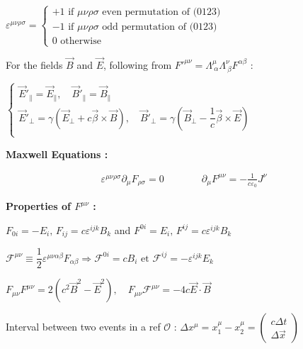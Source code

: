 \item $\varepsilon^{\mu\nu\rho\sigma} = 
\begin{cases}
+1 \, \, \text{if $\mu\nu\rho\sigma$ even permutation of (0123)}  \\
-1 \, \, \text{if $\mu\nu\rho\sigma$ odd permutation of (0123)} \\
0 \, \, \text{otherwise}	
\end{cases}$
\item For the fields $\vec{B}$ and $\vec{E}$, following from $F'^{\mu\nu}=\Lambda^\mu_{\ \alpha}\Lambda^\nu_{\ \beta} F^{\alpha\beta}$ : 
\item $\begin{cases}
\vec{E}'_{\parallel} = \vec{E}_{\parallel}, \quad \vec{B}'_{\parallel} = \vec{B}_{\parallel} \\
\vec{E}'_{\perp} = \gamma(\vec{E}_{\perp} + c \vec{\beta}\times \vec{B}), \quad \vec{B}'_{\perp} = \gamma(\vec{B}_{\perp} - \dfrac{1}{c}\vec{\beta} \times \vec{E} )\\
\end{cases}$
\item[] \textbf{Maxwell Equations :}

$$\boxed{\begin{split}
	\varepsilon^{\mu \nu \rho \sigma}\partial_\mu F_{\rho \sigma}=0  \qquad \quad & \partial_\mu F^{\mu\nu}=-\frac{1}{c\varepsilon_0}J^\nu 
	\end{split}}$$

\item \textbf{Properties of $F^{\mu\nu} $ :} 

\item $F_{0i} = -E_i, \,  F_{ij} =  c \varepsilon^{ijk}B_k$ and $F^{0i} = E_i, \, F^{ij} = c\varepsilon^{ijk}B_k$

\item $\mathcal{F}^{\mu\nu} \equiv \dfrac{1}{2} \varepsilon^{\mu\nu\alpha\beta}F_{\alpha\beta} \Rightarrow \mathcal{F}^{0i} = cB_i \,\, \text{et} \,\, \mathcal{F}^{ij} = -\varepsilon^{ijk}E_k$

\item $F_{\mu\nu}F^{\mu\nu} = 2(c^2\vec{B}^2 - \vec{E}^2), \quad F_{\mu\nu}\mathcal{F}^{\mu\nu} = -4c\vec{E}\cdot\vec{B}$

\squishend
{}
\squishlist
\item Interval between two events in a ref $\mathcal{O}$ : $ \Delta x^{\mu} = x_1^{\mu} - x_2^{\mu} = \begin{pmatrix}
    c\Delta t \\
    \Delta \vec{x}
\end{pmatrix}$ 


